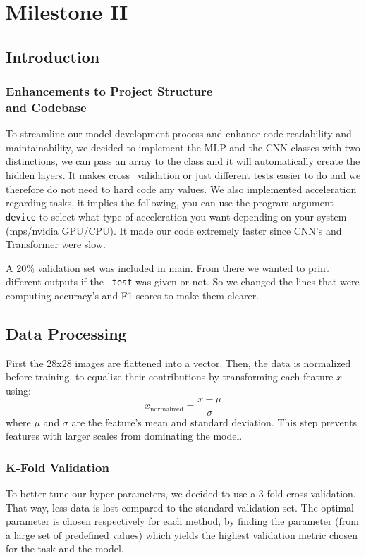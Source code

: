 \section{Milestone II}

\subsection{Introduction}

\subsubsection{Enhancements to Project Structure \\ and Codebase}
To streamline our model development process and enhance code readability and maintainability, we decided to implement the MLP and the CNN classes with two distinctions, we can pass an array to the class and it will automatically create the hidden layers. It makes cross\_validation or just different tests easier to do and we therefore do not need to hard code any values. 
We also implemented acceleration regarding tasks, it implies the following, you can use the program argument \texttt{--device} to select what type of acceleration you want depending on your system (mps/nvidia GPU/CPU).
It made our code extremely faster since CNN's and Transformer were slow.

A 20\% validation set was included in main. From there we wanted to print different outputs if the \texttt{--test} was given or not. So we changed the lines that were computing accuracy's and F1 scores to make them clearer.

\subsection{Data Processing}
First the 28x28 images are flattened into a vector. Then, the data is normalized before training, to equalize their contributions by transforming each feature \(x\) using: \[ x_{\text{normalized}} = \frac{x - \mu}{\sigma} \] where \(\mu\) and \(\sigma\) are the feature's mean and standard deviation. This step prevents features with larger scales from dominating the model.
\subsubsection{K-Fold Validation}
To better tune our hyper parameters, we decided to use a 3-fold cross validation. That way, less data is lost compared to the standard validation set. The optimal parameter is chosen respectively for each method, by finding the parameter (from a large set of predefined values) which yields the highest validation metric chosen for the task and the model.

